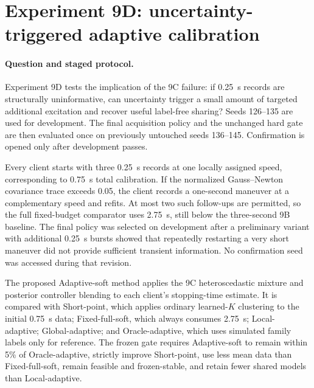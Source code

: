 \section{Experiment 9D: uncertainty-triggered adaptive calibration}
\label{sec:experiment9d}

\paragraph{Question and staged protocol.}
Experiment 9D tests the implication of the 9C failure: if 0.25~s records are
structurally uninformative, can uncertainty trigger a small amount of targeted
additional excitation and recover useful label-free sharing? Seeds 126--135 are
used for development. The final acquisition policy and the unchanged hard gate
are then evaluated once on previously untouched seeds 136--145. Confirmation is
opened only after development passes.

Every client starts with three 0.25~s records at one locally assigned speed,
corresponding to 0.75~s total calibration. If the normalized Gauss--Newton
covariance trace exceeds 0.05, the client records a one-second maneuver at a
complementary speed and refits. At most two such follow-ups are permitted, so
the full fixed-budget comparator uses 2.75~s, still below the three-second 9B
baseline. The final policy was selected on development after a preliminary
variant with additional 0.25~s bursts showed that repeatedly restarting a very
short maneuver did not provide sufficient transient information. No
confirmation seed was accessed during that revision.

The proposed Adaptive-soft method applies the 9C heteroscedastic mixture and
posterior controller blending to each client's stopping-time estimate. It is
compared with Short-point, which applies ordinary learned-$K$ clustering to the
initial 0.75~s data; Fixed-full-soft, which always consumes 2.75~s; Local-
adaptive; Global-adaptive; and Oracle-adaptive, which uses simulated family
labels only for reference. The frozen gate requires Adaptive-soft to remain
within 5\% of Oracle-adaptive, strictly improve Short-point, use less mean data
than Fixed-full-soft, remain feasible and frozen-stable, and retain fewer shared
models than Local-adaptive.

